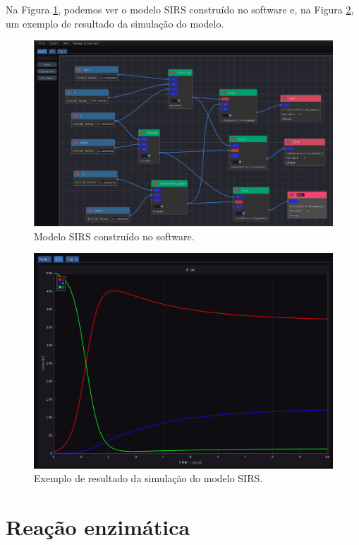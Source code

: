 \documentclass[
	12pt,				%
	openright,			%
	oneside,			%
	a4paper,			%
	main=brazil,
	english,			%
	]{ufsj-abntex2}
\begin{document}
Na Figura \ref{fig:sirs}, podemos ver o modelo SIRS construído no software e, na Figura \ref{fig:resultado-sirs}, um exemplo de resultado da simulação do modelo. 

\begin{figure}[h]
    \centering
    \includegraphics[width=\textwidth]{imgs/modelos/sirs.png} 
    \caption{Modelo SIRS construído no software.}
    \label{fig:sirs}
\end{figure}

\begin{figure}[h]
    \centering
    \includegraphics[width=\textwidth]{imgs/modelos/resultado-sirs.png} 
    \caption{Exemplo de resultado da simulação do modelo SIRS.}
    \label{fig:resultado-sirs}
\end{figure}

\section{Reação enzimática}
\end{document}
